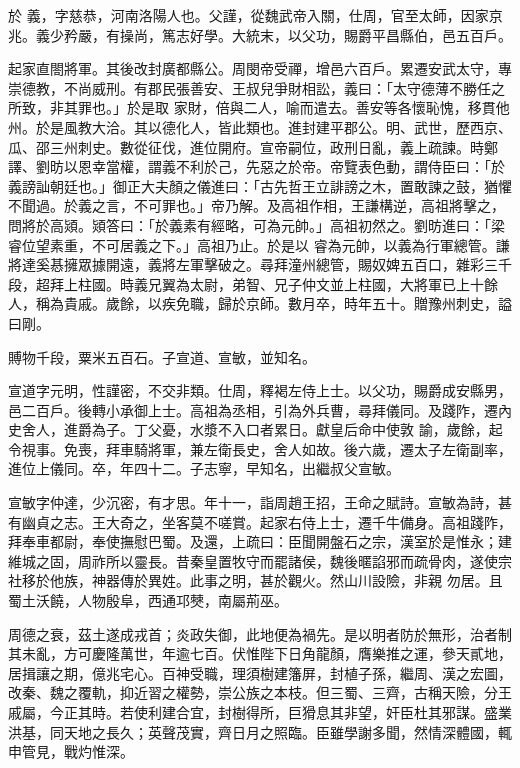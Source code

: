 
\begin{pinyinscope}

 於
 義，字慈恭，河南洛陽人也。父謹，從魏武帝入關，仕周，官至太師，因家京兆。義少矜嚴，有操尚，篤志好學。大統末，以父功，賜爵平昌縣伯，邑五百戶。



 起家直閤將軍。其後改封廣都縣公。周閔帝受禪，增邑六百戶。累遷安武太守，專崇德教，不尚威刑。有郡民張善安、王叔兒爭財相訟，義曰：「太守德薄不勝任之所致，非其罪也。」於是取
 家財，倍與二人，喻而遣去。善安等各懷恥愧，移貫他州。於是風教大洽。其以德化人，皆此類也。進封建平郡公。明、武世，歷西京、瓜、邵三州刺史。數從征伐，進位開府。宣帝嗣位，政刑日亂，義上疏諫。時鄭譯、劉昉以恩幸當權，謂義不利於己，先惡之於帝。帝覽表色動，謂侍臣曰：「於義謗訕朝廷也。」御正大夫顏之儀進曰：「古先哲王立誹謗之木，置敢諫之鼓，猶懼不聞過。於義之言，不可罪也。」帝乃解。及高祖作相，王謙構逆，高祖將擊之，問將於高熲。熲答曰：「於義素有經略，可為元帥。」高祖初然之。劉昉進曰：「梁睿位望素重，不可居義之下。」高祖乃止。於是以
 睿為元帥，以義為行軍總管。謙將達奚惎擁眾據開遠，義將左軍擊破之。尋拜潼州總管，賜奴婢五百口，雜彩三千段，超拜上柱國。時義兄翼為太尉，弟智、兄子仲文並上柱國，大將軍已上十餘人，稱為貴戚。歲餘，以疾免職，歸於京師。數月卒，時年五十。贈豫州刺史，謚曰剛。



 賻物千段，粟米五百石。子宣道、宣敏，並知名。



 宣道字元明，性謹密，不交非類。仕周，釋褐左侍上士。以父功，賜爵成安縣男，邑二百戶。後轉小承御上士。高祖為丞相，引為外兵曹，尋拜儀同。及踐阼，遷內史舍人，進爵為子。丁父憂，水漿不入口者累日。獻皇后命中使敦
 諭，歲餘，起令視事。免喪，拜車騎將軍，兼左衛長史，舍人如故。後六歲，遷太子左衛副率，進位上儀同。卒，年四十二。子志寧，早知名，出繼叔父宣敏。



 宣敏字仲達，少沉密，有才思。年十一，詣周趙王招，王命之賦詩。宣敏為詩，甚有幽貞之志。王大奇之，坐客莫不嗟賞。起家右侍上士，遷千牛備身。高祖踐阼，拜奉車都尉，奉使撫慰巴蜀。及還，上疏曰：臣聞開盤石之宗，漢室於是惟永；建維城之固，周祚所以靈長。昔秦皇置牧守而罷諸侯，魏後暱諂邪而疏骨肉，遂使宗社移於他族，神器傳於異姓。此事之明，甚於觀火。然山川設險，非親
 勿居。且蜀土沃饒，人物殷阜，西通邛僰，南屬荊巫。



 周德之衰，茲土遂成戎首；炎政失御，此地便為禍先。是以明者防於無形，治者制其未亂，方可慶隆萬世，年逾七百。伏惟陛下日角龍顏，膺樂推之運，參天貳地，居揖讓之期，億兆宅心。百神受職，理須樹建籓屏，封植子孫，繼周、漢之宏圖，改秦、魏之覆軌，抑近習之權勢，崇公族之本枝。但三蜀、三齊，古稱天險，分王戚屬，今正其時。若使利建合宜，封樹得所，巨猾息其非望，奸臣杜其邪謀。盛業洪基，同天地之長久；英聲茂實，齊日月之照臨。臣雖學謝多聞，然情深體國，輒申管見，戰灼惟深。




\end{pinyinscope}
